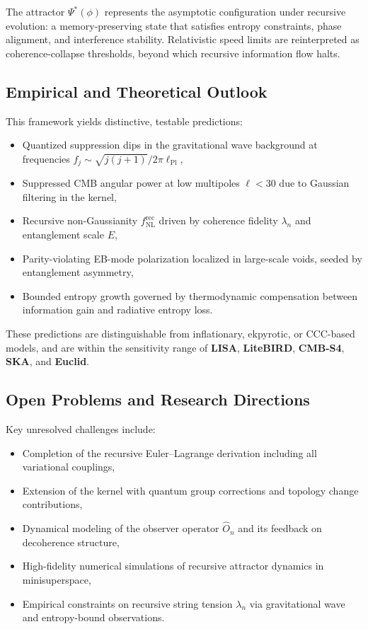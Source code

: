 The attractor \( \Psi^*(\phi) \) represents the asymptotic configuration under recursive evolution: a memory-preserving state that satisfies entropy constraints, phase alignment, and interference stability. Relativistic speed limits are reinterpreted as coherence-collapse thresholds, beyond which recursive information flow halts.

\subsection{Empirical and Theoretical Outlook}

This framework yields distinctive, testable predictions:
\begin{itemize}
    \item Quantized suppression dips in the gravitational wave background at frequencies \( f_j \sim \sqrt{j(j+1)} / 2\pi \ell_{\text{Pl}} \),
    \item Suppressed CMB angular power at low multipoles \( \ell < 30 \) due to Gaussian filtering in the kernel,
    \item Recursive non-Gaussianity \( f_{\text{NL}}^{\text{rec}} \) driven by coherence fidelity \( \lambda_n \) and entanglement scale \( E \),
    \item Parity-violating EB-mode polarization localized in large-scale voids, seeded by entanglement asymmetry,
    \item Bounded entropy growth governed by thermodynamic compensation between information gain and radiative entropy loss.
\end{itemize}

These predictions are distinguishable from inflationary, ekpyrotic, or CCC-based models, and are within the sensitivity range of \textbf{LISA}, \textbf{LiteBIRD}, \textbf{CMB-S4}, \textbf{SKA}, and \textbf{Euclid}.

\subsection{Open Problems and Research Directions}

Key unresolved challenges include:
\begin{itemize}
    \item Completion of the recursive Euler–Lagrange derivation including all variational couplings,
    \item Extension of the kernel with quantum group corrections and topology change contributions,
    \item Dynamical modeling of the observer operator \( \hat{O}_n \) and its feedback on decoherence structure,
    \item High-fidelity numerical simulations of recursive attractor dynamics in minisuperspace,
    \item Empirical constraints on recursive string tension \( \lambda_n \) via gravitational wave and entropy-bound observations.
\end{itemize}


